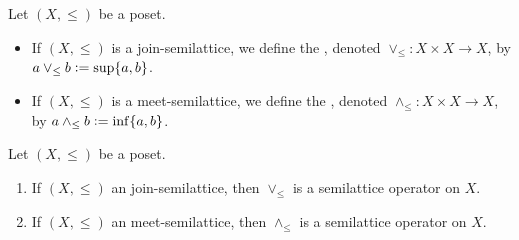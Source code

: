 \documentclass{book}
\begin{document}
	\begin{defn} 
		Let $(X, \leq)$ be a poset.
		\begin{itemize}
			\item If $(X, \leq)$ is a join-semilattice, we define the , denoted $\vee_{\leq}: X \times X \rightarrow X$, by $a \vee_{\leq} b \vcentcolon= \sup \{a,b\}$. 
			\item If $(X, \leq)$ is a meet-semilattice, we define the , denoted $\wedge_{\leq}: X \times X \rightarrow X$, by $a \wedge_{\leq} b \vcentcolon= \inf \{a,b\}$. 
		\end{itemize}
	\end{defn}
	
	\begin{ex} 
		Let $(X, \leq)$ be a poset.
		\begin{enumerate}
			\item If $(X, \leq)$ an join-semilattice, then $\vee_{\leq}$ is a semilattice operator on $X$.
			\item If $(X, \leq)$ an meet-semilattice, then $\wedge_{\leq}$ is a semilattice operator on $X$.
		\end{enumerate}
	\end{ex}
	
\end{document}
